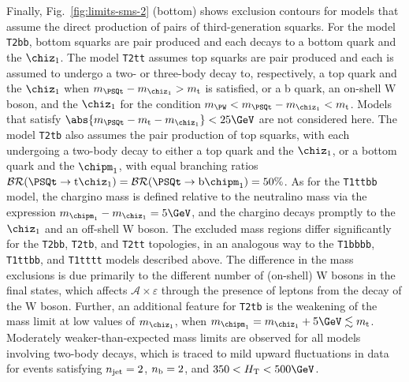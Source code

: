 Finally, Fig.~\ref{fig:limits-sms-2} (bottom) shows exclusion contours
for models that assume the direct production of pairs of
third-generation squarks. For the model \texttt{T2bb}, bottom squarks
are pair produced and each decays to a bottom quark and the
$\chiz_1$. The model \texttt{T2tt} assumes top squarks are pair
produced and each is assumed to undergo a two- or three-body decay to,
respectively, a top quark and the $\chiz_1$ when $m_{\PSQt} -
m_{\chiz_1} > m_\text{t}$ is satisfied, or a b quark, an on-shell W
boson, and the $\chiz_1$ for the condition $m_{\PW} < m_{\PSQt} -
m_{\chiz_1} < m_\text{t}$. Models that satisfy $\abs{m_{\PSQt} -
  m_\text{t} - m_{\chiz_1}} < 25\GeV$ are not considered here. The
model \texttt{T2tb} also assumes the pair production of top squarks,
with each undergoing a two-body decay to either a top quark and the
$\chiz_1$, or a bottom quark and the $\chipm_1$, with equal branching
ratios $\mathcal{BR}(\PSQt \ra \text{t}\chiz_1) = \mathcal{BR}(\PSQt
\ra \text{b}\chipm_1) = 50\%$. As for the \texttt{T1ttbb} model, the
chargino mass is defined relative to the neutralino mass via the
expression $m_{\chipm_1} - m_{\chiz_1} = 5\GeV$, and the chargino
decays promptly to the $\chiz_1$ and an off-shell W boson. The
excluded mass regions differ significantly for the \texttt{T2bb},
\texttt{T2tb}, and \texttt{T2tt} topologies, in an analogous way to
the \texttt{T1bbbb}, \texttt{T1ttbb}, and \texttt{T1tttt} models
described above. The difference in the mass exclusions is due
primarily to the different number of (on-shell) W bosons in the final
states, which affects $\mathcal{A} \times \varepsilon$ through the
presence of leptons from the decay of the W boson. Further, an
additional feature for \texttt{T2tb} is the weakening of the mass
limit at low values of $m_{\chiz_1}$, when $m_{\chipm_1} = m_{\chiz_1}
+ 5\GeV \lesssim m_\text{t}$. Moderately weaker-than-expected mass
limits are observed for all models involving two-body decays, which is
traced to mild upward fluctuations in data for events satisfying
$n_{\text{jet}} = 2$, $n_{\text{b}} = 2$, and $350 < \scalht < 500\GeV$.

